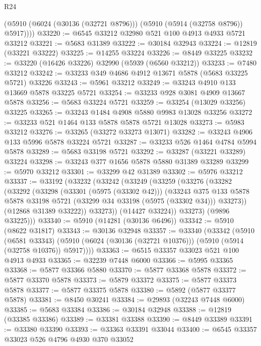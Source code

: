 \begin{lexlean}{R24}
\begin{coremodule}
        (@5910 (@6024 (@30136 (@32721 @8796))) (@5910 (@5914 (@32758 @8796)) @5917))))
@33220 := @6545 @33212 @32980 @521 @100 @4913 @4933 @5721 @33212
@33221 := @5683 @31389
@33222 := @30184 @32943
@33224 := @12819 (@33221 @33222)
@33225 := @14255 @33224
@33226 := @8449 @33225
@33232 := @33220 (@16426 @33226) @32990 (@5939 (@6560 @33212))
@33233 := @7480 @33212
@33242 := @33233 @349 @4686 @4912 @13671 @5878 (@5683 @33225 @5721) @33226
@33243 := @5961 @33212
@33249 := @33243 @4910 @133 @13669 @5878 @33225 @5721
@33254 := @33233 @928 @3081 @4909 @13667 @5878
@33256 := @5683 @33224 @5721
@33259 := @33254 (@13029 @33256) @33225
@33265 := @33243 @1484 @4908 @5880 @9983 @13028 @33256
@33272 := @33233 @521 @1464 @133 @5878 @5878 @5721 @13028
@33273 := @5983 @33212
@33276 := @33265 (@33272 @33273 @13071)
@33282 := @33243 @4906 @133 @5996 @5878 @33224 @5721
@33287 := @33233 @526 @1464 @4784 @5994 @5878
@33289 := @5683 @33198 @5721
@33292 := @33287 (@33221 @33289) @33224
@33298 := @33243 @377 @1656 @5878 @5880 @31389 @33289
@33299 := @5970 @33212
@33301 := @33299 @42 @31389
@33302 := @5976 @33212
@33337 := @33192
    (@33232
      (@33242
        (@33249
          (@33259
            (@33276
              (@33282
                (@33292
                  (@33298
                    (@33301 (@5975 (@33302 @42)))
                    (@33243
                      @375
                      @133
                      @5878
                      @5878
                      @33198
                      @5721
                      (@33299 @34 @33198 (@5975 (@33302 @34)))
                      @33273))
                  (@12868 @31389 @33222))
                @33273))
            (@14427 @33224))
          @33273)
        (@9896 @33225)))
@33340 := @5910 (@14281 (@30136 @6496))
@33342 := @5910 (@8622 @31817)
@33343 := @30136 @32948
@33357 := @33340
    (@33342
      (@5910
        (@6581 @33343)
        (@5910 (@6024 (@30136 (@32721 @10376))) (@5910 (@5914 (@32758 @10376)) @5917))))
@33363 := @6515 @33357 @33023 @521 @100 @4913 @4933
@33365 := @32239 @7448 @6000
@33366 := @5995 @33365
@33368 := @5877 @33366 @5880
@33370 := @5877 @33368 @5878
@33372 := @5877 @33370 @5878
@33373 := @5879 @33372
@33375 := @5877 @33373 @5878
@33377 := @5877 @33375 @5878
@33380 := @5892 (@5877 @33377 @5878)
@33381 := @8450 @30241
@33384 := @29893 (@32243 @7448 @6000)
@33385 := @5683 @33384
@33386 := @30184 @32948
@33388 := @12819 (@33385 @33386)
@33389 := @33381 @33388
@33390 := @8449 @33389
@33391 := @33380 @33390
@33393 := @33363 @33391 @33044
@33400 := @6545 @33357 @33023 @526 @4796 @4930 @370 @33052

\end{coremodule}
\end{lexlean}
